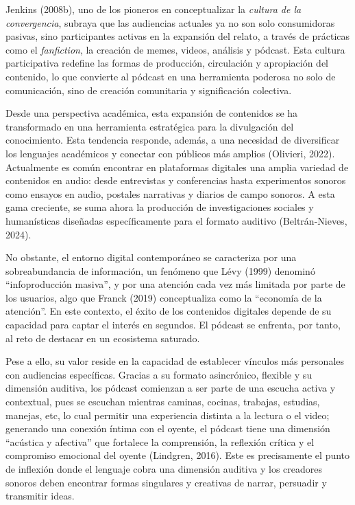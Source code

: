 \documentclass[
]{interact}
\begin{document}
Jenkins (2008b), uno de los pioneros en conceptualizar la \emph{cultura
de la convergencia}, subraya que las audiencias actuales ya no son solo
consumidoras pasivas, sino participantes activas en la expansión del
relato, a través de prácticas como el \emph{fanfiction}, la creación de
memes, videos, análisis y pódcast. Esta cultura participativa redefine
las formas de producción, circulación y apropiación del contenido, lo
que convierte al pódcast en una herramienta poderosa no solo de
comunicación, sino de creación comunitaria y significación colectiva.

Desde una perspectiva académica, esta expansión de contenidos se ha
transformado en una herramienta estratégica para la divulgación del
conocimiento. Esta tendencia responde, además, a una necesidad de
diversificar los lenguajes académicos y conectar con públicos más
amplios (Olivieri, 2022). Actualmente es común encontrar en plataformas
digitales una amplia variedad de contenidos en audio: desde entrevistas
y conferencias hasta experimentos sonoros como ensayos en audio,
postales narrativas y diarios de campo sonoros. A esta gama creciente,
se suma ahora la producción de investigaciones sociales y humanísticas
diseñadas específicamente para el formato auditivo (Beltrán-Nieves,
2024).

No obstante, el entorno digital contemporáneo se caracteriza por una
sobreabundancia de información, un fenómeno que Lévy (1999) denominó
``infoproducción masiva'', y por una atención cada vez más limitada por
parte de los usuarios, algo que Franck (2019) conceptualiza como la
``economía de la atención''. En este contexto, el éxito de los
contenidos digitales depende de su capacidad para captar el interés en
segundos. El pódcast se enfrenta, por tanto, al reto de destacar en un
ecosistema saturado.

Pese a ello, su valor reside en la capacidad de establecer vínculos más
personales con audiencias específicas. Gracias a su formato asincrónico,
flexible y su dimensión auditiva, los pódcast comienzan a ser parte de
una escucha activa y contextual, pues se escuchan mientras caminas,
cocinas, trabajas, estudias, manejas, etc, lo cual permitir una
experiencia distinta a la lectura o el video; generando una conexión
íntima con el oyente, el pódcast tiene una dimensión ``acústica y
afectiva'' que fortalece la comprensión, la reflexión crítica y el
compromiso emocional del oyente (Lindgren, 2016). Este es precisamente
el punto de inflexión donde el lenguaje cobra una dimensión auditiva y
los creadores sonoros deben encontrar formas singulares y creativas de
narrar, persuadir y transmitir ideas.
\end{document}
